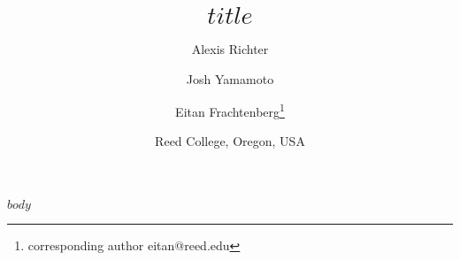 \documentclass[12pt]{article}
\title{$title$}
\author{Alexis Richter \and Josh Yamamoto \and Eitan Frachtenberg\thanks{corresponding author eitan@reed.edu}}
\date{Reed College, Oregon, USA}
\begin{document}
\maketitle


$body$

\newpage{}



\end{document}
